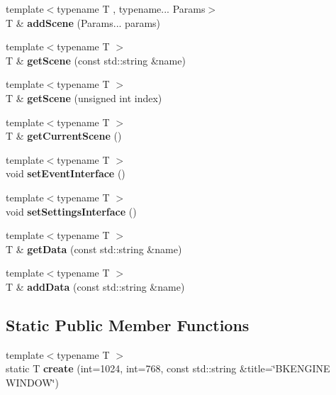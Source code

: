\begin{DoxyCompactItemize}
{\footnotesize template$<$typename T , typename... Params$>$ }\\T \& {\bfseries add\+Scene} (Params... params)
\item 
\mbox{\label{classbkengine_1_1Game_af33a446745d9e394b4ad4cf9fe7a6570}} 
{\footnotesize template$<$typename T $>$ }\\T \& {\bfseries get\+Scene} (const std\+::string \&name)
\item 
\mbox{\label{classbkengine_1_1Game_a19c505fb0c56f420f44366e16d69b85b}} 
{\footnotesize template$<$typename T $>$ }\\T \& {\bfseries get\+Scene} (unsigned int index)
\item 
\mbox{\label{classbkengine_1_1Game_a7a1bc30c47d3df980851633e99234161}} 
{\footnotesize template$<$typename T $>$ }\\T \& {\bfseries get\+Current\+Scene} ()
\item 
\mbox{\label{classbkengine_1_1Game_a1480bc58570c9fa4696a642ebe441d7e}} 
{\footnotesize template$<$typename T $>$ }\\void {\bfseries set\+Event\+Interface} ()
\item 
\mbox{\label{classbkengine_1_1Game_a4c86f004e97fe295c87ea2d756cf9793}} 
{\footnotesize template$<$typename T $>$ }\\void {\bfseries set\+Settings\+Interface} ()
\item 
\mbox{\label{classbkengine_1_1Game_ab816313a5cfdf6038b9b75a8c8c58730}} 
{\footnotesize template$<$typename T $>$ }\\T \& {\bfseries get\+Data} (const std\+::string \&name)
\item 
\mbox{\label{classbkengine_1_1Game_a9fd1d7e5a1ab1665f318cfc6d4aae057}} 
{\footnotesize template$<$typename T $>$ }\\T \& {\bfseries add\+Data} (const std\+::string \&name)
\end{DoxyCompactItemize}
\subsection*{Static Public Member Functions}
\begin{DoxyCompactItemize}
\item 
\mbox{\label{classbkengine_1_1Game_ad1be9a123f4758d1a3ec0a547a82612b}} 
{\footnotesize template$<$typename T $>$ }\\static T {\bfseries create} (int=1024, int=768, const std\+::string \&title=\char`\"{}B\+K\+E\+N\+G\+I\+NE W\+I\+N\+D\+OW\char`\"{})
\end{DoxyCompactItemize}


